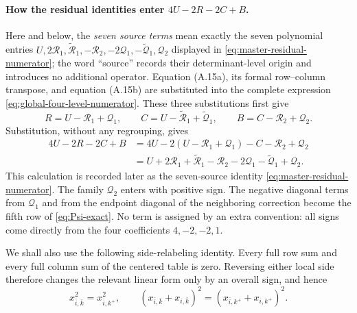 \documentclass[11pt]{article}
\begin{document}
\paragraph{How the residual identities enter $4U-2R-2C+B$.}
Here and below, the \emph{seven source terms} mean exactly the seven
polynomial entries
$U,2\mathcal R_1,\widetilde{\mathcal R}_1,-\mathcal R_2,
-2\mathcal Q_1,-\widetilde{\mathcal Q}_1,\mathcal Q_2$ displayed in
\eqref{eq:master-residual-numerator}; the word ``source'' records their
determinant-level origin and introduces no additional operator.
Equation (A.15a), its formal row--column transpose, and equation (A.15b) are
substituted into the complete expression \eqref{eq:global-four-level-numerator}.
These three substitutions first give
\[
R=U-\mathcal R_1+\mathcal Q_1,\qquad
C=U-\widetilde{\mathcal R}_1+\widetilde{\mathcal Q}_1,\qquad
B=C-\mathcal R_2+\mathcal Q_2.
\]
Substitution, without any regrouping, gives
\[
\begin{aligned}
4U-2R-2C+B
&=4U-2(U-\mathcal R_1+\mathcal Q_1)-C-\mathcal R_2+\mathcal Q_2\\
&=U+2\mathcal R_1+\widetilde{\mathcal R}_1-\mathcal R_2
  -2\mathcal Q_1-\widetilde{\mathcal Q}_1+\mathcal Q_2.
\end{aligned}
\]
This calculation is recorded later as the seven-source identity
\eqref{eq:master-residual-numerator}.
The family $\mathcal Q_2$ enters with positive sign.  The negative diagonal
terms from $\mathcal Q_1$ and from the endpoint diagonal of the neighboring
correction become the fifth row of \eqref{eq:Psi-exact}.  No term is assigned
by an extra convention: all signs come directly from the four coefficients
$4,-2,-2,1$.

We shall also use the following side-relabeling identity.  Every full row sum and every
full column sum of the centered table is zero.  Reversing either local side
therefore changes the relevant linear form only by an overall sign, and hence
\begin{equation}\label{eq:A16}
x_{\bar i,\bar k}^{2}=x_{\bar i,k^+}^{2},
\qquad
(x_{\bar i,\bar k}+x_{i,\bar k})^2
=(x_{\bar i,k^+}+x_{i,k^+})^2.
\tag{A.16}
\end{equation}
\end{document}
